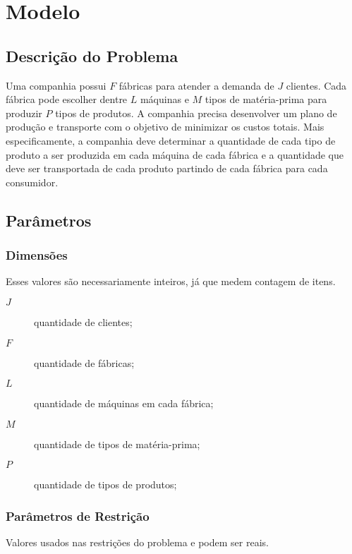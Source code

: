 \section{Modelo}

    \subsection{Descrição do Problema}

        Uma companhia possui $F$ fábricas para atender a demanda de $J$ clientes. Cada fábrica pode escolher dentre $L$ máquinas e $M$ tipos de matéria-prima para produzir $P$ tipos de produtos. A companhia precisa desenvolver um plano de produção e transporte com o objetivo de minimizar os custos totais. Mais especificamente, a companhia deve determinar a quantidade de cada tipo de produto a ser produzida em cada máquina de cada fábrica e a quantidade que deve ser transportada de cada produto partindo de cada fábrica para cada consumidor.

    \subsection{Parâmetros}

        \subsubsection{Dimensões}

            Esses valores são necessariamente inteiros, já que medem contagem de itens.

            \begin{description}
                \item[$J$] quantidade de clientes;
                \item[$F$] quantidade de fábricas;
                \item[$L$] quantidade de máquinas em cada fábrica;
                \item[$M$] quantidade de tipos de matéria-prima;
                \item[$P$] quantidade de tipos de produtos;
            \end{description}

        \subsubsection{Parâmetros de Restrição}

            Valores usados nas restrições do problema e podem ser reais.

